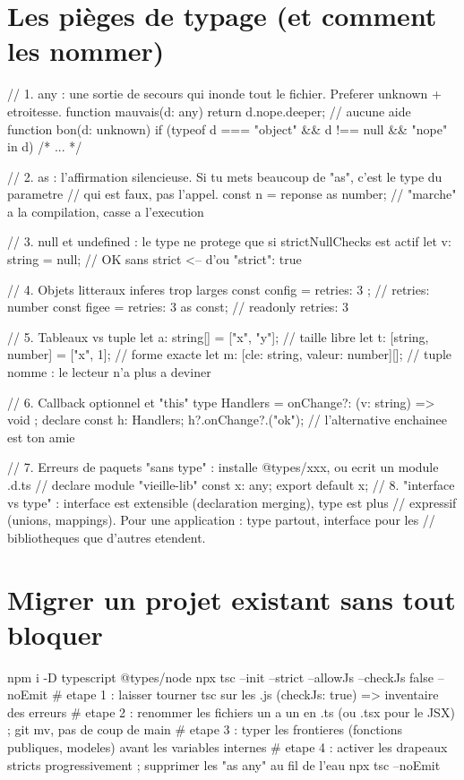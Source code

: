 \section{Les pi\`eges de typage (et comment les nommer)}

\begin{codejs}
// 1. any : une sortie de secours qui inonde tout le fichier. Preferer unknown + etroitesse.
function mauvais(d: any) { return d.nope.deeper; }        // aucune aide
function bon(d: unknown) {
  if (typeof d === "object" && d !== null && "nope" in d) { /* ... */ }
}

// 2. as : l'affirmation silencieuse. Si tu mets beaucoup de "as", c'est le type du parametre
//    qui est faux, pas l'appel.
const n = reponse as number;          // "marche" a la compilation, casse a l'execution

// 3. null et undefined : le type ne protege que si strictNullChecks est actif
let v: string = null;                  // OK sans strict  <-- d'ou "strict": true

// 4. Objets litteraux inferes trop larges
const config = { retries: 3 };         // { retries: number }
const figee = { retries: 3 } as const; // { readonly retries: 3 }

// 5. Tableaux vs tuple
let a: string[] = ["x", "y"];          // taille libre
let t: [string, number] = ["x", 1];     // forme exacte
let m: [cle: string, valeur: number][];  // tuple nomme : le lecteur n'a plus a deviner

// 6. Callback optionnel et "this"
type Handlers = { onChange?: (v: string) => void };
declare const h: Handlers;
h?.onChange?.("ok");                     // l'alternative enchainee est ton amie

// 7. Erreurs de paquets "sans type" : installe @types/xxx, ou ecrit un module .d.ts
//    declare module "vieille-lib" { const x: any; export default x; }
// 8. "interface vs type" : interface est extensible (declaration merging), type est plus
//    expressif (unions, mappings). Pour une application : type partout, interface pour les
//    bibliotheques que d'autres etendent.
\end{codejs}

\section{Migrer un projet existant sans tout bloquer}

\begin{terminal}
npm i -D typescript @types/node
npx tsc --init --strict --allowJs --checkJs false --noEmit
# etape 1 : laisser tourner tsc sur les .js (checkJs: true) => inventaire des erreurs
# etape 2 : renommer les fichiers un a un en .ts (ou .tsx pour le JSX) ; git mv, pas de coup de main
# etape 3 : typer les frontieres (fonctions publiques, modeles) avant les variables internes
# etape 4 : activer les drapeaux stricts progressivement ; supprimer les "as any" au fil de l'eau
npx tsc --noEmit
\end{terminal}

